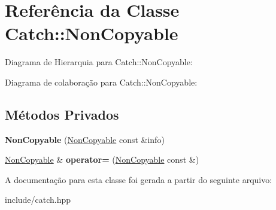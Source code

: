 \hypertarget{classCatch_1_1NonCopyable}{}\section{Referência da Classe Catch\+:\+:Non\+Copyable}
\label{classCatch_1_1NonCopyable}


Diagrama de Hierarquia para Catch\+:\+:Non\+Copyable\+:


Diagrama de colaboração para Catch\+:\+:Non\+Copyable\+:
\subsection*{Métodos Privados}
\begin{DoxyCompactItemize}
\item 
{\bfseries Non\+Copyable} (\hyperlink{classCatch_1_1NonCopyable}{Non\+Copyable} const \&info)\hypertarget{classCatch_1_1NonCopyable_a023f80cdb8c2c90e281521ad562ba8b0}{}\label{classCatch_1_1NonCopyable_a023f80cdb8c2c90e281521ad562ba8b0}

\item 
\hyperlink{classCatch_1_1NonCopyable}{Non\+Copyable} \& {\bfseries operator=} (\hyperlink{classCatch_1_1NonCopyable}{Non\+Copyable} const \&)\hypertarget{classCatch_1_1NonCopyable_a98369620c8483acf5b30b0d5d4694f27}{}\label{classCatch_1_1NonCopyable_a98369620c8483acf5b30b0d5d4694f27}

\end{DoxyCompactItemize}


A documentação para esta classe foi gerada a partir do seguinte arquivo\+:\begin{DoxyCompactItemize}
\item 
include/catch.\+hpp\end{DoxyCompactItemize}
